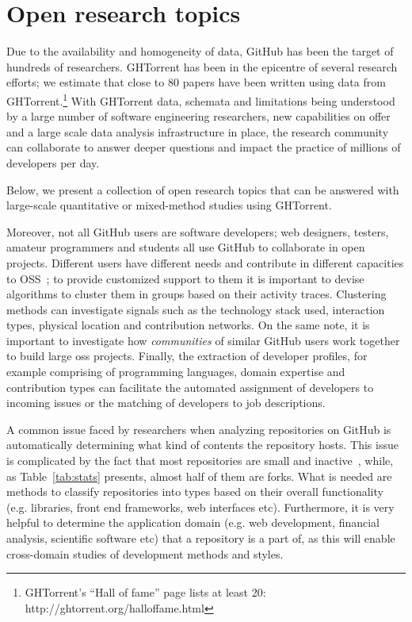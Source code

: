 \documentclass{sig-alternate}
\begin{document}
\section{Open research topics}

Due to the availability and homogeneity of data, GitHub has been the target of
hundreds of researchers. GHTorrent has been in the epicentre of several research
efforts; we estimate that close to 80 papers have been written using data from
GHTorrent.\footnote{GHTorrent's ``Hall of fame'' page lists at least 20:
http://ghtorrent.org/halloffame.html} With GHTorrent data, schemata and
limitations being understood by a large number of software engineering
researchers, new capabilities on offer and a large scale data analysis
infrastructure in place, the research community can collaborate to answer deeper
questions and impact the practice of millions of developers per day.

Below, we present a collection of open research topics that can be answered
with large-scale quantitative or mixed-method studies using GHTorrent.

 Moreover, not all GitHub users are
software developers; web designers, testers, amateur programmers and students
all use GitHub to collaborate in open projects. Different users have different
needs and contribute in different capacities to OSS~\cite{}; to provide
customized support to them it is important to devise algorithms to cluster them
in groups based on their activity traces. Clustering methods can investigate
signals such as the technology stack used, interaction types, physical location
and contribution networks. On the same note, it is important to investigate how
\emph{communities} of similar GitHub users work together to build large {\sc
oss} projects. Finally, the extraction of developer profiles, for example
comprising of programming languages, domain expertise and contribution types can
facilitate the automated assignment of developers to incoming issues or the
matching of developers to job descriptions.

 A common issue faced by researchers when
analyzing repositories on GitHub is automatically determining what kind of
contents the repository hosts. This issue is complicated by the fact that most
repositories are small and inactive~\cite{KGBSGD15}, while, as
Table~\ref{tab:stats} presents, almost half of them are forks. What is needed
are methods to classify repositories into types based on their overall
functionality (e.g. libraries, front end frameworks, web interfaces etc).
Furthermore, it is very helpful to determine the application domain (e.g. web
development, financial analysis, scientific software etc) that a repository is a
part of, as this will enable cross-domain studies of development methods and
styles.
\end{document}
